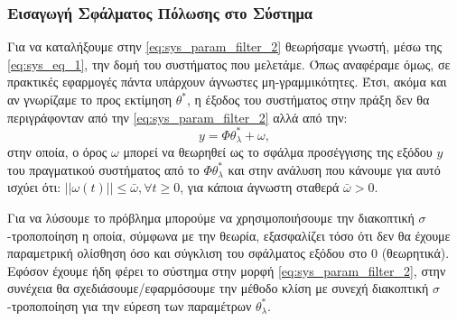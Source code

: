 \documentclass[12pt]{article} %
\numberwithin{equation}{section}  %
\begin{document}
\subsubsection{Εισαγωγή Σφάλματος Πόλωσης στο Σύστημα}
Για να καταλήξουμε στην \eqref{eq:sys_param_filter_2} θεωρήσαμε γνωστή, μέσω της \eqref{eq:sys_eq_1}, την δομή του συστήματος που μελετάμε.
Όπως αναφέραμε όμως, σε πρακτικές εφαρμογές πάντα υπάρχουν άγνωστες μη-γραμμικότητες. 
Έτσι, ακόμα και αν γνωρίζαμε το προς εκτίμηση \(\theta^*\), η έξοδος του συστήματος στην πράξη δεν θα περιγράφονταν από την \eqref{eq:sys_param_filter_2} αλλά από την:
\begin{equation}\label{eq:system_polosi}
    y = \Phi \theta_{\lambda}^{*} + \omega, 
\end{equation}
στην οποία, ο όρος \(\omega\) μπορεί να θεωρηθεί ως το σφάλμα προσέγγισης της εξόδου \(y\) του πραγματικού συστήματος από το $\Phi \theta_{\lambda}^{*}$ και στην ανάλυση που κάνουμε για αυτό ισχύει ότι: $||\omega(t)|| \le \bar{\omega}, \forall t \ge 0$, για κάποια άγνωστη σταθερά $\bar{\omega} > 0$.

Για να λύσουμε το πρόβλημα μπορούμε να χρησιμοποιήσουμε την διακοπτική $\sigma$-τροποποίηση η οποία, σύμφωνα με την θεωρία, 
εξασφαλίζει τόσο ότι δεν θα έχουμε παραμετρική ολίσθηση όσο και σύγκλιση του σφάλματος εξόδου στο $0$ (θεωρητικά).
Εφόσον έχουμε ήδη φέρει το σύστημα στην μορφή \eqref{eq:sys_param_filter_2}, στην συνέχεια θα σχεδιάσουμε/εφαρμόσουμε την μέθοδο κλίση με συνεχή διακοπτική $\sigma$-τροποποίηση για την εύρεση των παραμέτρων $\theta_{\lambda}^{*}$.
\end{document}

